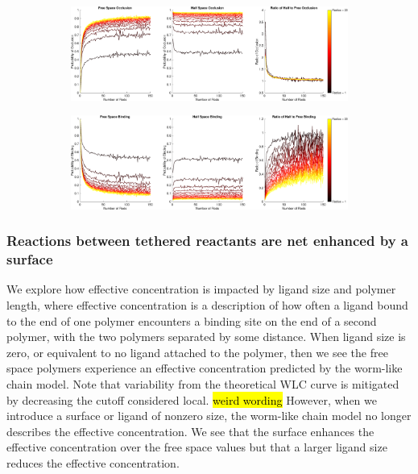\documentclass[../../AdvancementSummary.tex]{subfiles}
\begin{document}
\begin{figure}[H]
    \begin{center}
        \begin{subfigure}{\linewidth}
        		\includegraphics[width=\linewidth]{ResultsFigures/BindingSurfaceFactor/OcclusionVSN.eps}
        		\caption{}
        \end{subfigure}
        	\begin{subfigure}{\linewidth}
        		\includegraphics[width=\linewidth]{ResultsFigures/BindingSurfaceFactor/BindingVSN.eps}
        		\caption{}
        \end{subfigure}
        \caption{}
    \end{center}
\end{figure}

\subsubsection{Reactions between tethered reactants are net enhanced by a surface}

We explore how effective concentration is impacted by ligand size and polymer length, where effective concentration is a description of how often a ligand bound to the end of one polymer encounters a binding site on the end of a second polymer, with the two polymers separated by some distance. When ligand size is zero, or equivalent to no ligand attached to the polymer, then we see the free space polymers experience an effective concentration predicted by the worm-like chain model. Note that variability from the theoretical WLC curve is mitigated by decreasing the cutoff considered local. \hl{weird wording} However, when we introduce a surface or ligand of nonzero size, the worm-like chain model no longer describes the effective concentration.  We see that the surface enhances the effective concentration over the free space values but that a larger ligand size reduces the effective concentration.
\end{document}
